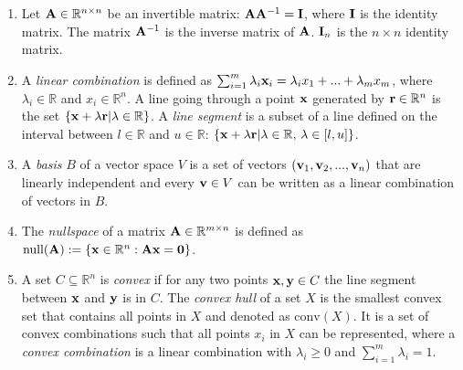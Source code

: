 \begin{enumerate}
    \item Let $\bold A \in \mathbb{R}^{n \times n}$ be an invertible matrix: $ \bold A \bold A^{-1} = \bold I$, where $\bold I$ is the identity matrix. The matrix $ \bold A^{-1}$ is the inverse matrix of $ \bold A$. %
    $\bold I_n$ is the $n \times n$ identity matrix.

    \item A \textit{linear combination} is defined as $\sum_{i=1}^{m} \lambda_i \bold x_i = 
    \lambda_i x_1 + ... + \lambda_m x_m$, where $\lambda_i \in \mathbb{R}$ and $x_i \in \mathbb{R}^n$.
    A line going through a point $\bold x$ generated by $\bold r \in \mathbb{R}^n$ is the set $\{\bold x + \lambda \bold r | \lambda \in \mathbb{R}\}$. A \textit{line segment} is a subset of a line defined on the interval between $l \in \mathbb{R}$ and $u \in \mathbb{R}$: $\{\bold x + \lambda \bold r | \lambda \in \mathbb{R}, \, \lambda \in [l, u ]\}$.

    \item A \textit{basis} $B$ of a vector space $V$ is a set of vectors $(\bold v_1, \bold v_2, ..., \bold v_n)$ that are linearly independent and every $\bold v \in V$ can be written as a linear combination of vectors in $B$.

    \item The \textit{nullspace} of a matrix $\bold A \in \mathbb{R}^{m \times n}$ is defined as $\text{null}(\bold A):=\{\bold x \in \mathbb{R}^n: \bold A \bold x = \bold 0\}$. 
    
    \item A set $C \subseteq \mathbb{R}^n$ is \textit{convex} if for any two points $\bold x, \bold y \in C$ the line segment between $\bold x$ and $\bold y$ is in $C$. %
    The \textit{convex hull} of a set $X$ is the smallest convex set that contains all points in $X$ and denoted as $\text{conv}(X)$. It is a set of convex combinations such that all points $x_i$ in $X$ can be represented, where a \textit{convex combination} is a linear combination with $\lambda_i \geq 0$ and $\sum_{i=1}^m \lambda_i = 1$.


\end{enumerate}
